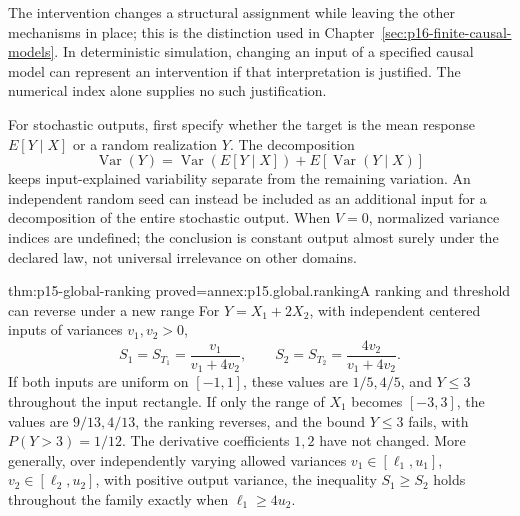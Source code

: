 The intervention changes a structural assignment while leaving the other
mechanisms in place; this is the distinction used in
Chapter~\ref{sec:p16-finite-causal-models}.
In deterministic simulation, changing an input of a specified causal
model can represent an intervention if that interpretation is justified.
The numerical index alone supplies no such justification.

For stochastic outputs, first specify whether the target is the mean
response \(E[Y\mid X]\) or a random realization \(Y\).
The decomposition
\[
 \operatorname{Var}(Y)
 =\operatorname{Var}(E[Y\mid X])
   +E[\operatorname{Var}(Y\mid X)]
\]
keeps input-explained variability separate from the remaining variation.
An independent random seed can instead be included as an additional
input for a decomposition of the entire stochastic output.
When \(V=0\), normalized variance indices are undefined; the conclusion
is constant output almost surely under the declared law, not universal
irrelevance on other domains.

\begin{hbtheorem}{thm:p15-global-ranking}
 {proved=annex:p15.global.ranking}{A ranking and threshold can reverse under a new range}
For \(Y=X_1+2X_2\), with independent centered inputs of variances
\(v_1,v_2>0\),
\[
 S_1=S_{T_1}=\frac{v_1}{v_1+4v_2},\qquad
 S_2=S_{T_2}=\frac{4v_2}{v_1+4v_2}.
\]
If both inputs are uniform on \([-1,1]\), these values are
\(1/5,4/5\), and \(Y\leq3\) throughout the input rectangle.
If only the range of \(X_1\) becomes \([-3,3]\), the values are
\(9/13,4/13\), the ranking reverses, and the bound \(Y\leq3\) fails,
with \(P(Y>3)=1/12\).
The derivative coefficients \(1,2\) have not changed.
More generally, over independently varying allowed variances
\(v_1\in[\ell_1,u_1]\), \(v_2\in[\ell_2,u_2]\), with positive output
variance, the inequality \(S_1\geq S_2\) holds throughout the family
exactly when \(\ell_1\geq4u_2\).
\end{hbtheorem}

